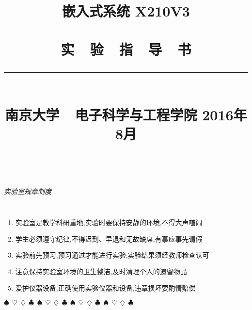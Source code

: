\documentclass[a4paper,11pt]{book}
\title{
\begin{flushright}
\bf 嵌入式系统 X210V3 \\ \ \\
\textsf{实~~验~~指~~导~~书}\\
\rule[10pt]{.6\textwidth}{2pt}\\
\large \textsf{南京大学~~电子科学与工程学院}
\vskip 4cm 2016年8月
\end{flushright}
}
\author{}
\date{}
\begin{document}
\pagestyle{empty}
\maketitle

\frontmatter
{}
\pagestyle{headings}
\setlength{\parindent}{2em}
\setlength\doublerulesep{.2pt}

\baselineskip=17pt
\setcounter{page}{1}
\tableofcontents

\newpage
 ~ \vskip 2cm

\begin{center} \LARGE \it \textsf{实验室规章制度} \end{center}
\large \tt
\begin{enumerate}\itemsep=-5pt
  \item 实验室是教学科研重地,实验时要保持安静的环境,不得大声喧闹
  \item 学生必须遵守纪律,不得迟到、早退和无故缺席,有事应事先请假
  \item 实验前先预习,预习通过才能进行实验;实验结果须经教师检查认可
  \item 注意保持实验室环境的卫生整洁,及时清理个人的遗留物品
  \item 爱护仪器设备,正确使用实验仪器和设备,违章损坏要酌情赔偿
\end{enumerate}

\vspace{4mm}\begin{center}
$\spadesuit~~ \heartsuit~~ \diamondsuit~~ \clubsuit~~
\spadesuit~~ \heartsuit~~ \diamondsuit~~ \clubsuit~~
\spadesuit~~ \heartsuit~~ \diamondsuit~~ \clubsuit~~
\spadesuit~~ \heartsuit~~ \diamondsuit~~ \clubsuit~~$
\end{center}\vspace{4mm}



\mainmatter


\setcounter{page}{1}












\clearpage
\end{document}
